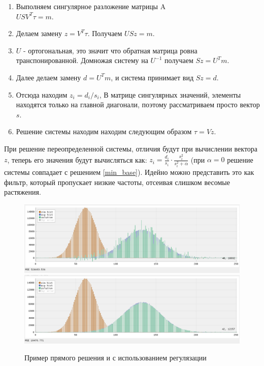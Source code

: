 \documentclass[a4paper,12pt]{diplom}
\begin{document}
\begin{enumerate}
    \item Выполняем сингулярное разложение матрицы A \\
    $USV^T \tau = m.$

    \item Делаем замену $z = V^T\tau$. Получаем $USz = m.$

    \item $U$ - ортогональная, это значит что обратная матрица ровна транспонированной. Домножая систему на $U^{-1}$ получаем $Sz=U^Tm$.

    \item Далее делаем замену $d=U^Tm$, и система принимает вид $Sz=d$.

    \item Отсюда находим $z_{i} = d_{i} / s_{i}$, В матрице сингулярных значений, элементы находятся только на главной диагонали, 
    поэтому рассматриваем просто вектор $s$.

    \item Решение системы находим находим следующим образом $\tau = Vz$.
\end{enumerate}

При решение переопределенной системы, отличия будут при вычислении вектора $z$, теперь его значения будут вычисляться как:
$z_{i} = \frac{d_{i}}{s_{i}} \cdot \frac{s^2_{i}}{s^2_{i} + \alpha}$ (при $\alpha = 0$ решение системы
совпадает с решением \eqref{min_base}). Идейно можно представить это как фильтр, который пропускает низкие частоты, отсеивая слишком 
весомые растяжения.

\begin{figure}[h]
   \includegraphics[width=\linewidth]{images/example_without_regulazation.png}
   \includegraphics[width=\linewidth]{images/example_regulazation.png}
   \caption{Пример прямого решения и с использованием регулязации}
\end{figure}
\end{document}
